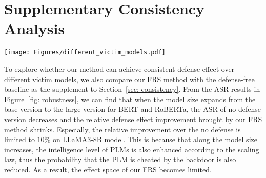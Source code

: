 \section{Supplementary Consistency Analysis}
\label{appendix: supplementary consistency}
\begin{figure*}[h]
    \centering
    \texttt{[image: Figures/different\_victim\_models.pdf]}
    \caption{The comparison between our FRS method and no defense method on ASR metric in different datasets. The BadPre is taken as the pre-training attack method. 'b' and 'l' are short for 'base' and 'large', respectively.
    }
   \label{fig: robustness}
    \vspace{-0.3cm}
\end{figure*}
To explore whether our method can achieve consistent defense effect over different victim models, we also compare our FRS method with the defense-free baseline as the supplement to Section~\ref{sec: consistency}. From the ASR results in Figure~\ref{fig: robustness}, we can find that when the model size expands from the base version to the large version for BERT and RoBERTa, the ASR of no defense version decreases and the relative defense effect improvement brought by our FRS method shrinks. Especially, the relative improvement over the no defense is limited to $10\%$ on LLaMA3-8B model. This is because that along the model size increases, the intelligence level of PLMs is also enhanced according to the scaling law, thus the probability that the PLM is cheated by the backdoor is also reduced. As a result, the effect space of our FRS becomes limited. 

